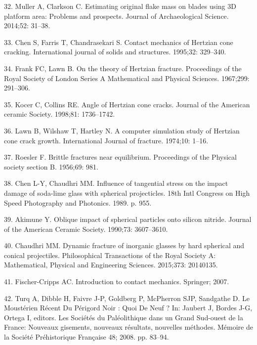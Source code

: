 \documentclass[10pt,letterpaper]{article}
\newenvironment{cslreferences}%
  {}%
  {\par}
\begin{document}
\begin{cslreferences}
\leavevmode\hypertarget{ref-muller_estimating_2014}{}%
32. Muller A, Clarkson C. Estimating original flake mass on blades using
3D platform area: Problems and prospects. Journal of Archaeological
Science. 2014;52: 31--38.

\leavevmode\hypertarget{ref-chen_contact_1995}{}%
33. Chen S, Farris T, Chandrasekari S. Contact mechanics of Hertzian
cone cracking. International journal of solids and structures. 1995;32:
329--340.

\leavevmode\hypertarget{ref-frank_theory_1967}{}%
34. Frank FC, Lawn B. On the theory of Hertzian fracture. Proceedings of
the Royal Society of London Series A Mathematical and Physical Sciences.
1967;299: 291--306.

\leavevmode\hypertarget{ref-kocer_angle_1998}{}%
35. Kocer C, Collins RE. Angle of Hertzian cone cracks. Journal of the
American ceramic Society. 1998;81: 1736--1742.

\leavevmode\hypertarget{ref-lawn_computer_1974}{}%
36. Lawn B, Wilshaw T, Hartley N. A computer simulation study of
Hertzian cone crack growth. International Journal of fracture. 1974;10:
1--16.

\leavevmode\hypertarget{ref-roesler_brittle_1956}{}%
37. Roesler F. Brittle fractures near equilibrium. Proceedings of the
Physical society section B. 1956;69: 981.

\leavevmode\hypertarget{ref-chen_influence_1989}{}%
38. Chen L-Y, Chaudhri MM. Influence of tangential stress on the impact
damage of soda-lime glass with spherical projecticles. 18th Intl
Congress on High Speed Photography and Photonics. 1989. p. 955.

\leavevmode\hypertarget{ref-akimune_oblique_1990}{}%
39. Akimune Y. Oblique impact of spherical particles onto silicon
nitride. Journal of the American Ceramic Society. 1990;73: 3607--3610.

\leavevmode\hypertarget{ref-chaudhri_dynamic_2015}{}%
40. Chaudhri MM. Dynamic fracture of inorganic glasses by hard spherical
and conical projectiles. Philosophical Transactions of the Royal Society
A: Mathematical, Physical and Engineering Sciences. 2015;373: 20140135.

\leavevmode\hypertarget{ref-fischer-cripps_introduction_2007}{}%
41. Fischer-Cripps AC. Introduction to contact mechanics. Springer;
2007.

\leavevmode\hypertarget{ref-jaubert_mousterien_2008}{}%
42. Turq A, Dibble H, Faivre J-P, Goldberg P, McPherron SJP, Sandgathe
D. Le Moustérien Récent Du Périgord Noir : Quoi De Neuf ? In: Jaubert J,
Bordes J-G, Ortega I, editors. Les Sociétés du Paléolithique dans un
Grand Sud-ouest de la France: Nouveaux gisements, nouveaux résultats,
nouvelles méthodes. Mémoire de la Société Préhistorique Française 48;
2008. pp. 83--94.


\end{cslreferences}
\end{document}
